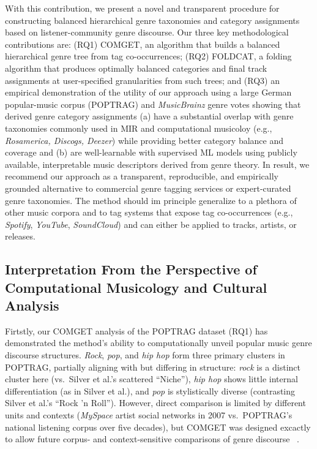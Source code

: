 \documentclass{article}
\begin{document}
With this contribution, we present a novel and transparent procedure for constructing balanced hierarchical genre taxonomies and category assignments based on listener-community genre discourse. Our three key methodological contributions are:  (RQ1) COMGET, an algorithm that builds a balanced hierarchical genre tree from tag co-occurrences; (RQ2) FOLDCAT, a folding algorithm that produces optimally balanced categories and final track assignments at user-specified granularities from such trees; and (RQ3) an empirical demonstration of the utility of our approach using a large German popular-music corpus (POPTRAG) and \textit{MusicBrainz} genre votes showing that derived genre category assignments (a) have a substantial overlap with genre taxonomies commonly used in MIR and computational musicoloy (e.g., \textit{Rosamerica, Discogs, Deezer}) while providing better category balance and coverage and (b) are well-learnable with supervised ML models using publicly available, interpretable music descriptors derived from genre theory. In result, we recommend our approach as a transparent, reproducible, and empirically grounded alternative to commercial genre tagging services or expert-curated genre taxonomies. The method should im principle generalize to a plethora of other music corpora and to tag systems that expose tag co-occurrences (e.g., \textit{Spotify}, \textit{YouTube}, \textit{SoundCloud}) and can either be applied to tracks, artists, or releases.


\subsection{Interpretation From the Perspective of Computational Musicology and Cultural Analysis}

Firtstly, our COMGET analysis of the POPTRAG dataset (RQ1) has demonstrated the method's ability to computationally unveil popular music genre discourse structures. \textit{Rock}, \textit{pop}, and \textit{hip hop} form three primary clusters in POPTRAG, partially aligning with \citet{silverGenreComplexesPopular2016} but differing in structure: \textit{rock} is a distinct cluster here (vs.\ Silver et al.'s scattered ``Niche''), \textit{hip hop} shows little internal differentiation (as in Silver et al.), and \textit{pop} is stylistically diverse (contrasting Silver et al.'s ``Rock 'n Roll''). However, direct comparison is limited by different units and contexts (\textit{MySpace} artist social networks in 2007 vs.\ POPTRAG's national listening corpus over five decades), but COMGET was designed excactly to allow future corpus- and context-sensitive comparisons of genre discourse
~\citep{pichlMiningCultureSpecificMusic2017}.
\end{document}
